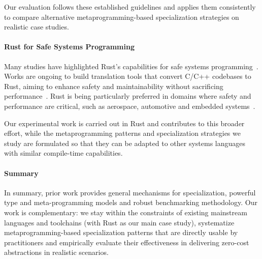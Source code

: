 Our evaluation follows these established guidelines and applies them consistently to compare alternative metaprogramming-based specialization strategies on realistic case studies.

\paragraph{Rust for Safe Systems Programming}
Many studies have highlighted Rust's capabilities for safe systems programming~\cite{SafeSystemsProgrammingRust21, SystemProgrammingRustBeyondSafety17}.
Works are ongoing to build translation tools that convert C/C++ codebases to Rust, aiming to enhance safety and maintainability without sacrificing performance~\cite{Tripuramallu2024TowardsAT}.
Rust is being particularly preferred in domains where safety and performance are critical, such as aerospace, automotive and embedded systems~\cite{Seidel2024BringingRT, RustEmbeddedBook}.

Our experimental work is carried out in Rust and contributes to this broader effort, while the metaprogramming patterns and specialization strategies we study are formulated so that they can be adapted to other systems languages with similar compile-time capabilities.

\paragraph{Summary}
In summary, prior work provides general mechanisms for specialization, powerful type and meta-programming models and robust benchmarking methodology.
Our work is complementary: we stay within the constraints of existing mainstream languages and toolchains (with Rust as our main case study), systematize metaprogramming-based specialization patterns that are directly usable by practitioners and empirically evaluate their effectiveness in delivering zero-cost abstractions in realistic scenarios.